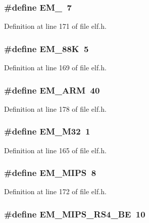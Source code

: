 \subsubsection[{EM\_\-860}]{\setlength{\rightskip}{0pt plus 5cm}\#define EM\_~7}\label{elf_8h_80e7667a64867c4252a1c3a6333514d9}




Definition at line 171 of file elf.h.
\subsubsection[{EM\_\-88K}]{\setlength{\rightskip}{0pt plus 5cm}\#define EM\_\-88K~5}\label{elf_8h_66801fe3ae7746ab9386537d236cd4e4}




Definition at line 169 of file elf.h.
\subsubsection[{EM\_\-ARM}]{\setlength{\rightskip}{0pt plus 5cm}\#define EM\_\-ARM~40}\label{elf_8h_d8fac71aae0d2fbfab30f278a79c941a}




Definition at line 178 of file elf.h.
\subsubsection[{EM\_\-M32}]{\setlength{\rightskip}{0pt plus 5cm}\#define EM\_\-M32~1}\label{elf_8h_19b0cea9b063bb97e84b0931ebc7d699}




Definition at line 165 of file elf.h.
\subsubsection[{EM\_\-MIPS}]{\setlength{\rightskip}{0pt plus 5cm}\#define EM\_\-MIPS~8}\label{elf_8h_3168ea327621f9848abb996540342fb6}




Definition at line 172 of file elf.h.
\subsubsection[{EM\_\-MIPS\_\-RS4\_\-BE}]{\setlength{\rightskip}{0pt plus 5cm}\#define EM\_\-MIPS\_\-RS4\_\-BE~10}\label{elf_8h_3019d28c5f45f83df6bf5152a418be4f}




